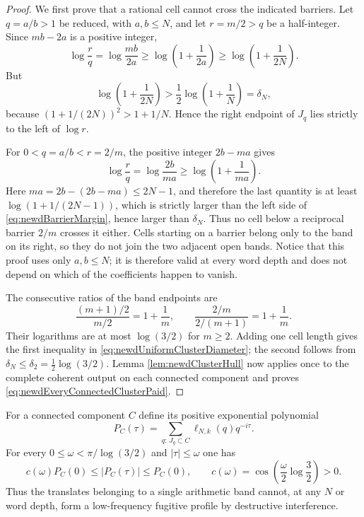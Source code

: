 \begin{proof}
We first prove that a rational cell cannot cross the indicated barriers.
Let $q=a/b>1$ be reduced, with $a,b\leq N$, and let $r=m/2>q$ be a
half-integer.  Since $mb-2a$ is a positive integer,
\[
 \log\frac rq
 =\log\frac{mb}{2a}
 \geq\log\left(1+\frac1{2a}\right)
 \geq\log\left(1+\frac1{2N}\right).
\]
But
\begin{equation}\label{eq:newdBarrierMargin}
 \log\left(1+\frac1{2N}\right)
 >\frac12\log\left(1+\frac1N\right)=\delta_N,
\end{equation}
because $(1+1/(2N))^2>1+1/N$.  Hence the right endpoint of $J_q$ lies
strictly to the left of $\log r$.

For $0<q=a/b<r=2/m$, the positive integer $2b-ma$ gives
\[
 \log\frac rq
 =\log\frac{2b}{ma}
 \geq\log\left(1+\frac1{ma}\right).
\]
Here $ma=2b-(2b-ma)\leq2N-1$, and therefore the last quantity is at least
$\log(1+1/(2N-1))$, which is strictly larger than the left side of
\eqref{eq:newdBarrierMargin}, hence larger than $\delta_N$.  Thus no cell
below a reciprocal barrier $2/m$ crosses it either.  Cells starting on a
barrier belong only to the band on its right, so they do not join the two
adjacent open bands.  Notice that this proof uses only $a,b\leq N$; it is
therefore valid at every word depth and does not depend on which of the
coefficients happen to vanish.

The consecutive ratios of the band endpoints are
\[
 \frac{(m+1)/2}{m/2}=1+\frac1m,
 \qquad
 \frac{2/m}{2/(m+1)}=1+\frac1m.
\]
Their logarithms are at most $\log(3/2)$ for $m\geq2$.  Adding one cell
length gives the first inequality in
\eqref{eq:newdUniformClusterDiameter}; the second follows from
$\delta_N\leq\delta_2=\tfrac12\log(3/2)$.  Lemma
\ref{lem:newdClusterHull} now applies once to the complete coherent output
on each connected component and proves
\eqref{eq:newdEveryConnectedClusterPaid}.
\end{proof}

\begin{corollary}
\label{cor:newdBandCoherence}
For a connected component $C$ define its positive exponential polynomial
\[
 P_C(\tau)=\sum_{q:\,J_q\subset C}\ell_{N,k}(q)q^{-i\tau}.
\]
For every $0\leq\omega<\pi/\log(3/2)$ and $|\tau|\leq\omega$ one has
\begin{equation}\label{eq:newdBandCoherence}
 c(\omega)P_C(0)\leq |P_C(\tau)|\leq P_C(0),
 \qquad
 c(\omega)=
 \cos\!\left(\frac{\omega}{2}\log\frac32\right)>0.
\end{equation}
Thus the translates belonging to a single arithmetic band cannot, at any
$N$ or word depth, form a low-frequency fugitive profile by destructive
interference.
\end{corollary}

